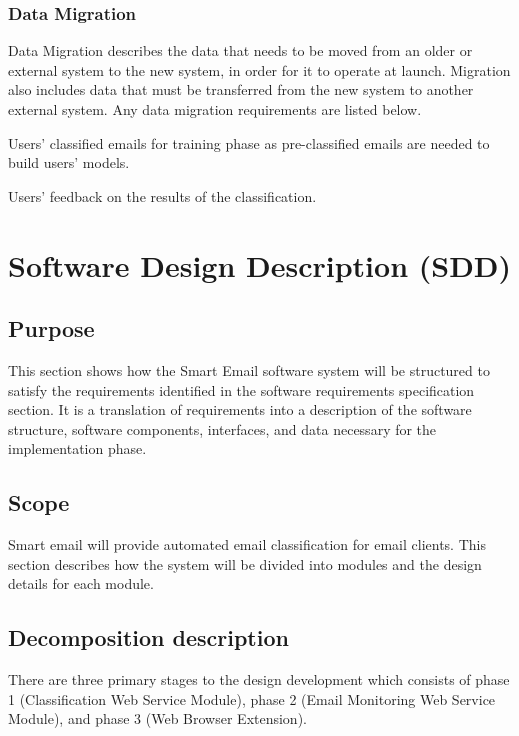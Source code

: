 \subsubsection{Data Migration}
Data Migration describes the data that needs to be moved from an older or external 
system to the new system, in order for it to operate at launch. Migration also includes 
data that must be transferred from the new system to another external system. 
Any data migration requirements are listed below.

\begin{my_enumerate}
  \item Users' classified emails for training phase as pre-classified emails are needed to build users' models.
  \item Users' feedback on the results of the classification.
\end{my_enumerate}


\section{Software Design Description (SDD)}


\subsection{Purpose}
This section shows how the Smart Email software system will be 
structured to satisfy the requirements identified in the software
requirements specification section. It is a translation of 
requirements into a description of the software structure, software components, 
interfaces, and data necessary for the implementation phase.

\subsection{Scope}
Smart email will provide automated email classification for email clients. 
This section describes how the system will be divided into modules and 
the design details for each module.


\subsection{Decomposition description}
There are three primary stages to the design development which consists of phase 1 
(Classification Web Service Module), phase 2 (Email Monitoring Web Service Module),
and phase 3 (Web Browser Extension).

